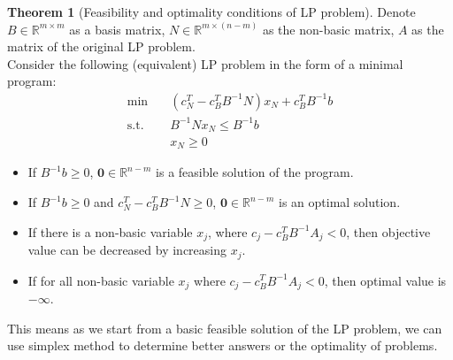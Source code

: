 \documentclass{article}
\theoremstyle{definition}
\newtheorem{theorem}{Theorem}[section]
\begin{document}
	\begin{theorem}[Feasibility and optimality conditions of LP problem]\hfill\break
	    Denote $B \in \mathbb{R}^{m \times m}$ as a basis matrix, $N \in \mathbb{R}^{m \times (n-m)}$ as the non-basic matrix, $A$ as the matrix of the original LP problem.\\
	    Consider the following (equivalent) LP problem in the form of a minimal program:
		\begin{align*}
			\text{min} \quad& (c_N^T - c_B^T B^{-1} N) x_N + c_B^T B^{-1} b \\
			\text{s.t.} \quad& B^{-1}Nx_N \leq B^{-1}b \\
			\quad& x_N \geq 0
		\end{align*}
		\begin{itemize}
			\item If $B^{-1}b \geq 0$, $\mathbf{0} \in \mathbb{R}^{n-m}$ is a feasible solution of the program.
			\item If $B^{-1}b \geq 0$ and $c_N^T - c_B^T B^{-1} N \geq 0$, $\mathbf{0} \in \mathbb{R}^{n-m}$ is an optimal solution.
			\item If there is a non-basic variable $x_j$, where $c_j-c_B^TB^{-1}A_j < 0$, then objective value can be decreased by increasing $x_j$.
			\item If for all non-basic variable $x_j$ where $c_j-c_B^TB^{-1}A_j < 0$, then optimal value is $-\infty$.
		\end{itemize}
		This means as we start from a basic feasible solution of the LP problem, we can use simplex method to determine better answers or the optimality of problems.
	\end{theorem}
\end{document}
